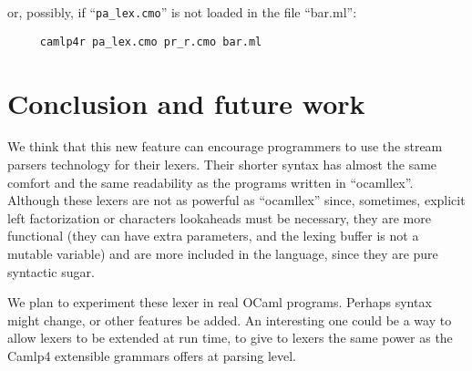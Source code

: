 \documentclass[11pt]{article}
\begin{document}
or, possibly, if ``\verb/pa_lex.cmo/'' is not loaded in the file ``bar.ml'':

\begin{verbatim}
     camlp4r pa_lex.cmo pr_r.cmo bar.ml
\end{verbatim}

\section{Conclusion and future work}
\label{conclusion}

We think that this new feature can encourage programmers to use the
stream parsers technology for their lexers. Their shorter syntax has
almost the same comfort and the same readability as the programs
written in ``ocamllex''. Although these lexers are not as powerful as
``ocamllex'' since, sometimes, explicit left factorization or
characters lookaheads must be necessary, they are more functional
(they can have extra parameters, and the lexing buffer is not a
mutable variable) and are more included in the language, since they
are pure syntactic sugar.

We plan to experiment these lexer in real OCaml programs. Perhaps
syntax might change, or other features be added. An interesting one
could be a way to allow lexers to be extended at run time, to give to
lexers the same power as the Camlp4 extensible grammars offers at
parsing level.

\nocite{Goscinny}



\end{document}
